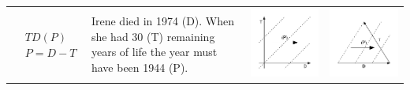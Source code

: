 \documentclass[12pt,oneside,letter]{article} %
\begin{document}
\begin{center}
\begin{longtable}{m{}m{}m{}m{}}
  \midrule
  $$\begin{aligned}
    &TD(P) \\
    &P = D - T
  \end{aligned}$$ &
  Irene died in 1974 (D). When she had 30 (T) remaining years of life the year
  must have been 1944 (P).& \includegraphics[width =
  \linewidth]{Figures/JonasTable/TDp.pdf} & \includegraphics[width = \linewidth]{Figures/JonasTable/TDp_iso.pdf}  \\

\end{longtable}
\end{center}
\end{document}
